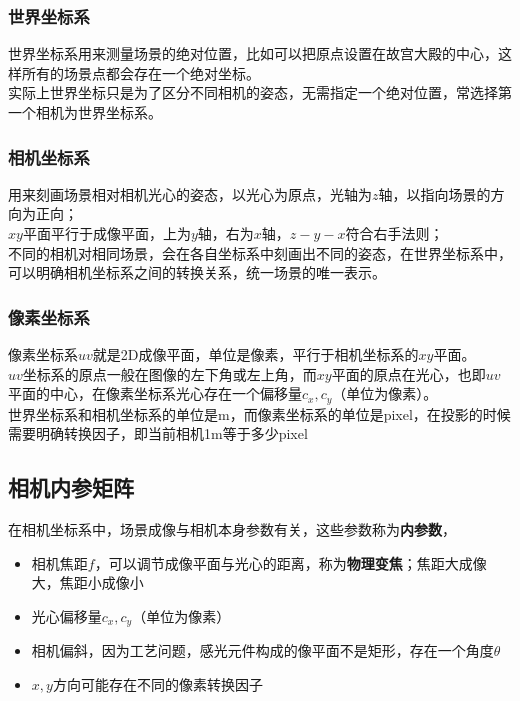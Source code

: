 	\subsubsection*{世界坐标系}
		世界坐标系用来测量场景的绝对位置，比如可以把原点设置在故宫大殿的中心，这样所有的场景点都会存在一个绝对坐标。\\

		实际上世界坐标只是为了区分不同相机的姿态，无需指定一个绝对位置，常选择第一个相机为世界坐标系。

	\subsubsection*{相机坐标系}
		用来刻画场景相对相机光心的姿态，以光心为原点，光轴为$z$轴，以指向场景的方向为正向；\\

		$xy$平面平行于成像平面，上为$y$轴，右为$x$轴，$z-y-x$符合右手法则；\\

		不同的相机对相同场景，会在各自坐标系中刻画出不同的姿态，在世界坐标系中，可以明确相机坐标系之间的转换关系，统一场景的唯一表示。

	\subsubsection*{像素坐标系}
		像素坐标系$uv$就是2D成像平面，单位是像素，平行于相机坐标系的$xy$平面。\\

		$uv$坐标系的原点一般在图像的左下角或左上角，而$xy$平面的原点在光心，也即$uv$平面的中心，在像素坐标系光心存在一个偏移量$c_x,c_y$（单位为像素）。\\

		世界坐标系和相机坐标系的单位是m，而像素坐标系的单位是pixel，在投影的时候需要明确转换因子，即当前相机1m等于多少pixel

\subsection{相机内参矩阵}
	在相机坐标系中，场景成像与相机本身参数有关，这些参数称为\textbf{内参数}，

	\begin{itemize}
		\item 相机焦距$f$，可以调节成像平面与光心的距离，称为\textbf{物理变焦}；焦距大成像大，焦距小成像小
		\item 光心偏移量$c_x,c_y$（单位为像素）
		\item 相机偏斜，因为工艺问题，感光元件构成的像平面不是矩形，存在一个角度$\theta$
		\item $x,y$方向可能存在不同的像素转换因子
	\end{itemize}

